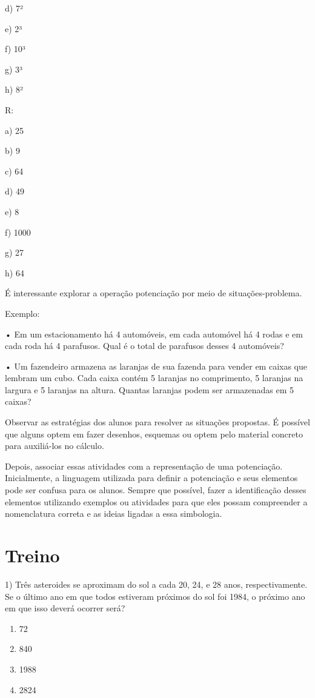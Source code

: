 d) 7²

e) 2³

f) 10³

g) 3³

h) 8²

R:

a) 25

b) 9

c) 64

d) 49

e) 8

f) 1000

g) 27

h) 64

É interessante explorar a operação potenciação por meio de
situações-problema.

Exemplo:

• Em um estacionamento há 4 automóveis, em cada automóvel há 4 rodas e
em cada roda há 4 parafusos. Qual é o total de parafusos desses 4
automóveis?

• Um fazendeiro armazena as laranjas de sua fazenda para vender em
caixas que lembram um cubo. Cada caixa contém 5 laranjas no comprimento,
5 laranjas na largura e 5 laranjas na altura. Quantas laranjas podem ser
armazenadas em 5 caixas?

Observar as estratégias dos alunos para resolver as situações propostas.
É possível que alguns optem em fazer desenhos, esquemas ou optem pelo
material concreto para auxiliá-los no cálculo.

Depois, associar essas atividades com a representação de uma
potenciação. Inicialmente, a linguagem utilizada para definir a
potenciação e seus elementos pode ser confusa para os alunos. Sempre que
possível, fazer a identificação desses elementos utilizando exemplos ou
atividades para que eles possam compreender a nomenclatura correta e as
ideias ligadas a essa simbologia.

\section{Treino}

1) Três asteroides se aproximam do sol a cada 20, 24, e 28 anos,
respectivamente. Se o último ano em que todos estiveram próximos do sol
foi 1984, o próximo ano em que isso deverá ocorrer será?

\begin{enumerate}
\def\labelenumi{\alph{enumi})}
\item
  72
\item
  840
\item
  1988
\item
  2824
\end{enumerate}

